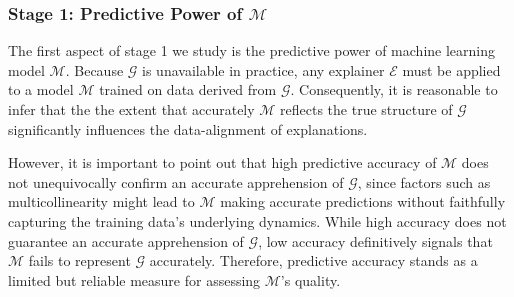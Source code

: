 \documentclass[mnsc,blindrev]{informs3}
\newcommand{\mM}{\mathcal{M}}
\begin{document}
    \subsubsection{Stage 1: Predictive Power of $\mathcal{M}$ }
        \label{sec:role_of_predictive_power}
           The first aspect of stage 1 we study is the predictive power of machine learning model $\mathcal{M}$. Because $\mathcal{G}$ is unavailable in practice, any explainer $\mathcal{E}$ must be applied to a model $\mathcal{M}$ trained on data derived from $\mathcal{G}$. Consequently, it is reasonable to infer that the the extent that accurately $\mathcal{M}$ reflects the true structure of $\mathcal{G}$ significantly influences the data-alignment of explanations. %

           However, it is important to point out that high predictive accuracy of $\mathcal{M}$ does not unequivocally confirm an accurate apprehension of $\mathcal{G}$, since factors such as multicollinearity might lead to $\mathcal{M}$ making accurate predictions without faithfully capturing the training data's underlying dynamics. %
           While high accuracy does not guarantee an accurate apprehension of $\mathcal{G}$, low accuracy definitively signals that $\mathcal{M}$ fails to represent $\mathcal{G}$ accurately. Therefore, predictive accuracy stands as a limited but reliable measure for assessing $\mathcal{M}$'s quality.
 
\end{document}
